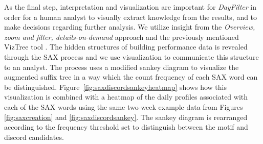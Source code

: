 As the final step, interpretation and visualization are important for \emph{DayFilter} in order for a human analyst to visually extract knowledge from the results, and to make decisions regarding further analysis. We utilize insight from the \emph{Overview, zoom and filter, details-on-demand} approach \cite{Shneiderman:1996jt} and the previously mentioned VizTree tool \cite{Lin:2004wv}. The hidden structures of building performance data is revealed through the SAX process and we use visualization to communicate this structure to an analyst. The process uses a modified sankey diagram to visualize the augmented suffix tree in a way which the count frequency of each SAX word can be distinguished.  Figure~\ref{fig:saxdiscordsankeyheatmap} shows how this visualization is combined with a heatmap of the daily profiles associated with each of the SAX words using the same two-week example data from Figures \ref{fig:saxcreation} and \ref{fig:saxdiscordsankey}. The sankey diagram is rearranged according to the frequency threshold set to distinguish between the motif and discord candidates.
